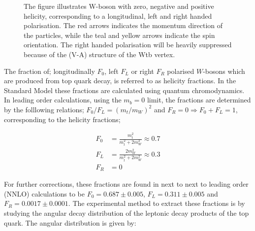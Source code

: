 \documentclass[12pt,a4paper]{article}
\numberwithin{equation}{section}
\begin{document}
\begin{figure}[H]
\begin{tikzpicture}
  \end{tikzpicture}
  \caption{The figure illustrates W-boson with zero, negative and positive
    helicity, corresponding to a longitudinal, left and right handed
    polarisation. The red arrows indicates the momentum direction of the
    particles, while the teal and yellow arrows indicate the spin orientation.
    The right handed polarisation will be heavily suppressed because of the
    (V-A) structure of the Wtb vertex.}\label{fig:polarisation}
\end{figure}

The fraction of; longitudinally $F_0$, left $F_L$ or right $F_R$ polarised
$W$-bosons which are produced from top quark decay, is referred to as helicity
fractions. In the Standard Model these fractions are calculated using quantum
chromodynamics. In leading order calculations, using the $m_b = 0$ limit, the
fractions are determined by the folllowing relations; $F_0/F_L = (m_t/m_W)^2$
and $F_R = 0 \Rightarrow F_0 + F_L = 1$, corresponding to the helicity fractions;

\begin{align}
\label{eq:helfrac}
  F_0 &= \frac{m_t^2}{m_t^2 + 2 m_W^2} \approx 0.7\\
  F_L &= \frac{2 m_W^2}{m_t^2 + 2 m_W^2} \approx 0.3\\
  F_R &= 0
\end{align}

For further corrections, these fractions are found in next to next to leading
order (NNLO) calculations to be $F_0 = 0.687 \pm 0.005$, $F_L = 0.311 \pm 0.005$
and $F_R = 0.0017 \pm 0.0001$\cite{Czarnecki_2010}. The experimental method to
extract these fractions is by studying the angular decay distribution of the
leptonic decay products of the top quark. The angular distribution is given by:
\end{document}
